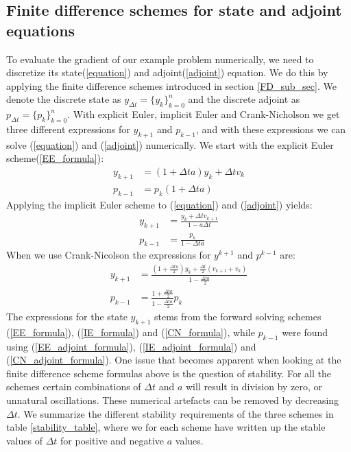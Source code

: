 \subsection{Finite difference schemes for state and adjoint equations}
To evaluate the gradient of our example problem numerically, we need to discretize its state(\ref{equation}) and adjoint(\ref{adjoint}) equation. We do this by applying the finite difference schemes introduced in section \ref{FD_sub_sec}. We denote the discrete state as $y_{\Delta t}=\{y_k\}_{k=0}^{n}$ and the discrete adjoint as $p_{\Delta t}=\{p_k\}_{k=0}^{n}$. With explicit Euler, implicit Euler and Crank-Nicholson we get three different expressions for $y_{k+1}$ and $p_{k-1}$, and with these expressions we can solve (\ref{equation}) and (\ref{adjoint}) numerically. We start with the explicit Euler scheme(\ref{EE_formula}):
\begin{align}
y_{k+1}&=(1 +\Delta ta) y_{k} + \Delta t v_{k}\label{E_state} \\
p_{k-1} &=p_k(1 +\Delta ta)\label{E_adjoint}
\end{align}
Applying the implicit Euler scheme to (\ref{equation}) and (\ref{adjoint}) yields:
\begin{align}
y_{k+1} &=\frac{y_{k} +\Delta t v_{k+1}}{1-a\Delta t} \label{I_state} \\
p_{k-1} &= \frac{p_k}{1-\Delta ta} \label{I_adjoint}
\end{align}
When we use Crank-Nicolson the expressions for $y^{k+1}$ and $p^{k-1}$ are:
\begin{align}
y_{k+1} &= \frac{(1+\frac{\Delta ta}{2})y_k +\frac{\Delta t}{2}(v_{k+1}+v_{k})}{1-\frac{\Delta t a}{2}}\label{CN_FD_state} \\
p_{k-1} &= \frac{1+\frac{\Delta ta}{2}}{1-\frac{\Delta t a}{2}}p_k\label{CN_FD_adjoint}
\end{align}
The expressions for the state $y_{k+1}$ stems from the forward solving schemes (\ref{EE_formula}), (\ref{IE_formula}) and (\ref{CN_formula}), while $p_{k-1}$ were found using (\ref{EE_adjoint_formula}), (\ref{IE_adjoint_formula}) and (\ref{CN_adjoint_formula}). One issue that becomes apparent when looking at the finite difference scheme formulas above is the question of stability. For all the schemes certain combinations of $\Delta t$ and $a$ will result in division by zero, or unnatural oscillations. These numerical artefacts can be removed by decreasing $\Delta t$. We summarize the different stability requirements of the three schemes in table \ref{stability_table}, where we for each scheme have written up the stable values of $\Delta t$ for positive and negative $a$ values.  

